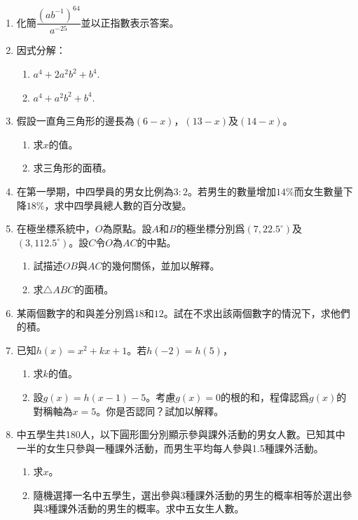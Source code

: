 \documentclass[12pt]{article}
\begin{document}
    \begin{enumerate}
        \item 化簡$\dfrac{(ab^{-1})^{64}}{a^{-25}}$並以正指數表示答案。
        \item 因式分解：\begin{enumerate}
            \item $a^4+2a^2b^2+b^4$.
            \item $a^4+a^2b^2+b^4$.
        \end{enumerate}
        \item 假設一直角三角形的邊長為$(6-x)$，$(13-x)$及$(14-x)$。\begin{enumerate}
            \item 求$x$的值。
            \item 求三角形的面積。
        \end{enumerate}
        \item 在第一學期，中四學員的男女比例為$3:2$。若男生的數量增加$14\%$而女生數量下降$18\%$，求中四學員總人數的百分改變。
        \item 在極坐標系統中，$O$為原點。設$A$和$B$的極坐標分別爲$(7,22.5^\circ)$及$(3,112.5^\circ)$。設$C$令$O$為$AC$的中點。\begin{enumerate}
            \item 試描述$OB$與$AC$的幾何關係，並加以解釋。
            \item 求$\triangle ABC$的面積。
        \end{enumerate}
        \item 某兩個數字的和與差分別爲$18$和$12$。試在不求出該兩個數字的情況下，求他們的積。
        \item 已知$h(x)=x^2+kx+1$。若$h(-2)=h(5)$，\begin{enumerate}
            \item 求$k$的值。
            \item 設$g(x)=h(x-1)-5$。考慮$g(x)=0$的根的和，程偉認爲$g(x)$的對稱軸為$x=5$。你是否認同？試加以解釋。
        \end{enumerate}
        \item 中五學生共180人，以下圓形圖分別顯示參與課外活動的男女人數。已知其中一半的女生只參與一種課外活動，而男生平均每人參與1.5種課外活動。\begin{enumerate}
            \item 求$x$。
            \item 隨機選擇一名中五學生，選出參與3種課外活動的男生的概率相等於選出參與3種課外活動的男生的概率。求中五女生人數。
        \end{enumerate}

\end{enumerate}
\end{document}
